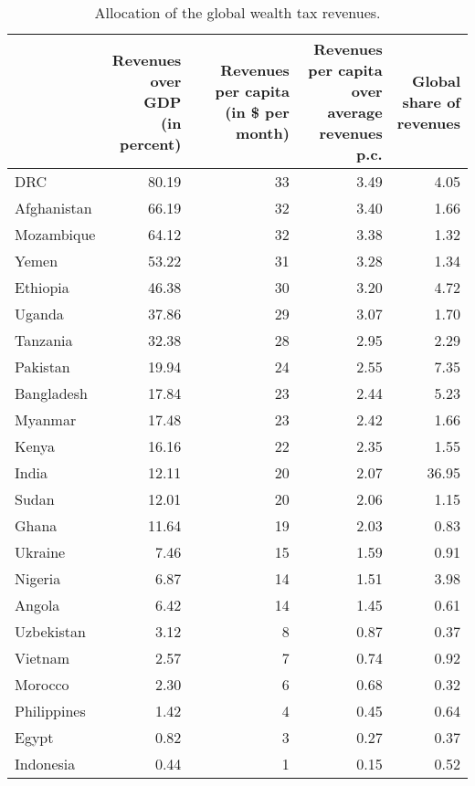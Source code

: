 
\begin{longtable}[t]{lrrrr}
\caption{\label{tab:allocation}Allocation of the global wealth tax revenues.}\\
\toprule
  & \makecell{Revenues\\over GDP\\(in percent)} & \makecell{Revenues\\per capita\\(in \$ per month)} & \makecell{Revenues per capita\\over average\\revenues p.c.} & \makecell{Global\\share of\\revenues}\\
\midrule
DRC & 80.19 & 33 & 3.49 & 4.05\\
Afghanistan & 66.19 & 32 & 3.40 & 1.66\\
Mozambique & 64.12 & 32 & 3.38 & 1.32\\
Yemen & 53.22 & 31 & 3.28 & 1.34\\
Ethiopia & 46.38 & 30 & 3.20 & 4.72\\
Uganda & 37.86 & 29 & 3.07 & 1.70\\
Tanzania & 32.38 & 28 & 2.95 & 2.29\\
Pakistan & 19.94 & 24 & 2.55 & 7.35\\
Bangladesh & 17.84 & 23 & 2.44 & 5.23\\
Myanmar & 17.48 & 23 & 2.42 & 1.66\\
Kenya & 16.16 & 22 & 2.35 & 1.55\\
India & 12.11 & 20 & 2.07 & 36.95\\
Sudan & 12.01 & 20 & 2.06 & 1.15\\
Ghana & 11.64 & 19 & 2.03 & 0.83\\
Ukraine & 7.46 & 15 & 1.59 & 0.91\\
Nigeria & 6.87 & 14 & 1.51 & 3.98\\
Angola & 6.42 & 14 & 1.45 & 0.61\\
Uzbekistan & 3.12 & 8 & 0.87 & 0.37\\
Vietnam & 2.57 & 7 & 0.74 & 0.92\\
Morocco & 2.30 & 6 & 0.68 & 0.32\\
Philippines & 1.42 & 4 & 0.45 & 0.64\\
Egypt & 0.82 & 3 & 0.27 & 0.37\\
Indonesia & 0.44 & 1 & 0.15 & 0.52\\
\bottomrule
\end{longtable}